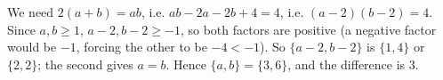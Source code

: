We need $2(a+b)=ab$, i.e. $ab-2a-2b+4=4$, i.e. $(a-2)(b-2)=4$. Since $a,b\ge1$, $a-2,b-2\ge-1$, so both factors are positive (a negative factor would be $-1$, forcing the other to be $-4<-1$). So $\{a-2,b-2\}$ is $\{1,4\}$ or $\{2,2\}$; the second gives $a=b$. Hence $\{a,b\}=\{3,6\}$, and the difference is $\boxed{3}$.
